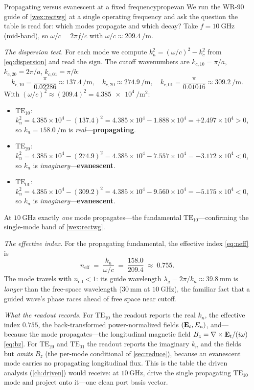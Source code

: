 \begin{workedexample}{Propagating versus evanescent at a fixed frequency}{propevan}
We run the WR-90 guide of \cref{wex:rectwg} at a single operating frequency and ask
the question the table is read for: which modes propagate and which decay? Take
$f=\SI{10}{\giga\hertz}$ (mid-band), so $\omega/c = 2\pi f/c$ with
$\omega/c \approx \SI{209.4}{\per\metre}$.

\emph{The dispersion test.} For each mode we compute $k_n^2 = (\omega/c)^2 - k_c^2$
from \eqref{eq:dispersion} and read the sign. The cutoff wavenumbers are
$k_{c,10}=\pi/a$, $k_{c,20}=2\pi/a$, $k_{c,01}=\pi/b$:
\[
  k_{c,10} = \frac{\pi}{0.02286} \approx \SI{137.4}{\per\metre},
  \quad
  k_{c,20} \approx \SI{274.9}{\per\metre},
  \quad
  k_{c,01} = \frac{\pi}{0.01016} \approx \SI{309.2}{\per\metre}.
\]
With $(\omega/c)^2 \approx (209.4)^2 = \SI{4.385e4}{\per\metre\squared}$:
\begin{itemize}[nosep]
  \item $\mathrm{TE}_{10}$: $k_n^2 = 4.385\times10^4 - (137.4)^2
    = 4.385\times10^4 - 1.888\times10^4 = +2.497\times10^4>0$, so
    $k_n=\SI{158.0}{\per\metre}$ is \emph{real}---\textbf{propagating}.
  \item $\mathrm{TE}_{20}$: $k_n^2 = 4.385\times10^4 - (274.9)^2
    = 4.385\times10^4 - 7.557\times10^4 = -3.172\times10^4<0$, so $k_n$ is
    \emph{imaginary}---\textbf{evanescent}.
  \item $\mathrm{TE}_{01}$: $k_n^2 = 4.385\times10^4 - (309.2)^2
    = 4.385\times10^4 - 9.560\times10^4 = -5.175\times10^4<0$, so $k_n$ is
    \emph{imaginary}---\textbf{evanescent}.
\end{itemize}
At $\SI{10}{\giga\hertz}$ exactly \emph{one} mode propagates---the fundamental
$\mathrm{TE}_{10}$---confirming the single-mode band of \cref{wex:rectwg}.

\emph{The effective index.} For the propagating fundamental, the effective index
\eqref{eq:neff} is
\[
  n_\text{eff} \;=\; \frac{k_n}{\omega/c}
    \;=\; \frac{158.0}{209.4}
    \;\approx\; 0.755.
\]
The mode travels with $n_\text{eff}<1$: its guide wavelength
$\lambda_g=2\pi/k_n\approx\SI{39.8}{\milli\metre}$ is \emph{longer} than the
free-space wavelength ($\SI{30}{\milli\metre}$ at $\SI{10}{\giga\hertz}$), the
familiar fact that a guided wave's phase races ahead of free space near cutoff.

\emph{What the readout records.} For $\mathrm{TE}_{10}$ the readout reports the real
$k_n$, the effective index $0.755$, the back-transformed power-normalized fields
$(\mathbf{E}_t,E_n)$, and---because the mode propagates---the longitudinal magnetic field
$B_z=\nabla\times\mathbf{E}_t/(i\omega)$ \eqref{eq:bz}. For $\mathrm{TE}_{20}$ and
$\mathrm{TE}_{01}$ the readout reports the imaginary $k_n$ and the fields but
\emph{omits} $B_z$ (the per-mode conditional of \cref{sec:reduce}), because an
evanescent mode carries no propagating longitudinal flux. This is the table the
driven analysis (\cref{ch:driven}) would receive: at $\SI{10}{\giga\hertz}$, drive
the single propagating $\mathrm{TE}_{10}$ mode and project onto it---one clean port
basis vector.
\end{workedexample}

